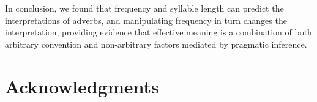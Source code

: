 \documentclass[10pt,letterpaper]{article}
\begin{document}
In conclusion, we found that frequency and syllable length can predict the interpretations of adverbs, and manipulating frequency in turn changes the interpretation, providing evidence that effective meaning is a combination of both arbitrary convention and non-arbitrary factors mediated by pragmatic inference.






\section{Acknowledgments}

\nocite{web1t5gram}
\nocite{lewis}
\nocite{saussure}



\setlength{\bibleftmargin}{.125in}
\setlength{\bibindent}{-\bibleftmargin}


\end{document}
